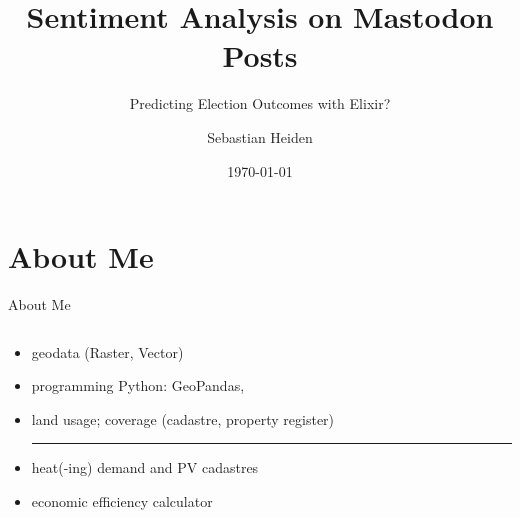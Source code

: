 \documentclass[usenames,dvipsnames,aspectratio=169]{beamer}
\title{Sentiment Analysis on Mastodon Posts}
\subtitle{Predicting Election Outcomes with Elixir?}
\author{Sebastian Heiden}
\institute{Harz University of Applied Sciences}
\date{\today}
\begin{document}
	
	{
		\begin{frame}
			\titlepage
		\end{frame}
	}
	
	
	\section{About Me}
	\begin{frame}{About Me}
		\begin{columns}
			
			\begin{column}{0.45\textwidth}
				\begin{tcolorbox}[colback=white, colframe=ElixirPurple, arc=3mm, boxrule=0mm, height=0.8\textheight, valign=center, title=Working Live]
					
					\begin{itemize}
						\item geodata (Raster, Vector)
						\item programming Python: GeoPandas, 
						\item land usage; coverage (cadastre, property register)
						
						\hrule
						
						\item heat(-ing) demand and PV cadastres
						\item economic efficiency calculator
					\end{itemize}
				\end{tcolorbox}
			\end{column}
			

\end{columns}
\end{frame}
\end{document}
